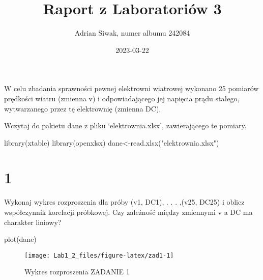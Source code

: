 \documentclass[
  12pt,
]{article}
\title{Raport z Laboratoriów 3}
\author{Adrian Siwak, numer albumu 242084}
\date{2023-03-22}
\newenvironment{Shaded}{\begin{snugshade}}{\end{snugshade}}
\newcommand{\FunctionTok}[1]{\textcolor[rgb]{0.00,0.00,0.00}{#1}}
\newcommand{\NormalTok}[1]{#1}
\newcommand{\OtherTok}[1]{\textcolor[rgb]{0.56,0.35,0.01}{#1}}
\newcommand{\SpecialCharTok}[1]{\textcolor[rgb]{0.00,0.00,0.00}{#1}}
\newcommand{\StringTok}[1]{\textcolor[rgb]{0.31,0.60,0.02}{#1}}
\begin{document}
\maketitle

{
\setcounter{tocdepth}{2}
\tableofcontents
}
W celu zbadania sprawności pewnej elektrowni wiatrowej wykonano 25
pomiarów prędkości wiatru (zmienna v) i odpowiadającego jej napięcia
prądu stałego, wytwarzanego przez tę elektrownię (zmienna DC).

Wczytaj do pakietu dane z pliku `elektrownia.xlsx', zawierającego te
pomiary.

\begin{Shaded}
\begin{Highlighting}[]
\FunctionTok{library}\NormalTok{(xtable)}
\FunctionTok{library}\NormalTok{(openxlsx)}
\NormalTok{dane}\OtherTok{\textless{}{-}}\FunctionTok{read.xlsx}\NormalTok{(}\StringTok{"elektrownia.xlsx"}\NormalTok{)}
\end{Highlighting}
\end{Shaded}

\hypertarget{section}{%
\section{1}\label{section}}

Wykonaj wykres rozproszenia dla próby (v1, DC1), . . . ,(v25, DC25) i
oblicz współczynnik korelacji próbkowej. Czy zależność między zmiennymi
v a DC ma charakter liniowy?

\begin{Shaded}
\begin{Highlighting}[]
\FunctionTok{plot}\NormalTok{(dane)}
\end{Highlighting}
\end{Shaded}

\begin{figure}[H]

{\centering \texttt{[image: Lab1\_2\_files/figure-latex/zad1-1]} 

}

\caption{\label{fig:wykres_rozrzutu_zad1}Wykres rozproszenia ZADANIE 1}\label{fig:zad1}
\end{figure}

\begin{Shaded}
\end{Shaded}
\end{document}
